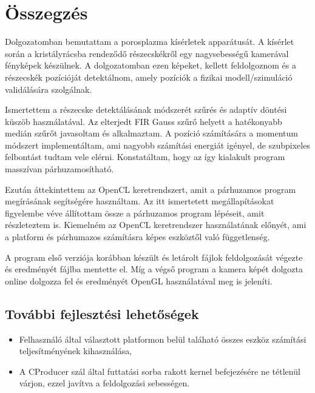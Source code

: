 \chapter{Összegzés}
	Dolgozatomban bemutattam a porosplazma kísérletek apparátusát. A kísérlet során a kristályrácsba
	rendeződő részecskékről egy nagysebességű kamerával fényképek készülnek. A dolgozatomban ezen
	képeket, kellett feldolgoznom és a részecskék pozícióját detektálnom, amely pozíciók a fizikai modell/szimuláció validálására
	szolgálnak.
	
	Ismertettem a részecske detektálásának módszerét szűrés és adaptív döntési küszöb használatával.
	Az elterjedt FIR Gauss szűrő helyett a hatékonyabb medián szűrőt javasoltam és alkalmaztam. A
	pozíció számítására a momentum módszert implementáltam, ami nagyobb számítási energiát igényel, de
	szubpixeles felbontást tudtam vele elérni. Konstatáltam, hogy az így kialakult program masszívan párhuzamosítható.
	
	Ezután áttekintettem az OpenCL keretrendszert, amit a párhuzamos program megírásának segítségére
	használtam. Az itt ismertetett megállapításokat figyelembe véve állítottam össze a párhuzamos
	program lépéseit, amit részleteztem is. Kiemelném az OpenCL keretrendszer használatának előnyét, ami a platform és párhumazos
	számításra képes eszköztől való függetlenség.
	
	A program első verziója korábban készült és letárolt fájlok feldolgozását végezte és eredményét fájlba mentette el. Míg a végső
	program a kamera képét dolgozta online dolgozza fel és eredményét OpenGL használatával meg is jeleníti.
	
	\section*{További fejlesztési lehetőségek}
	\begin{itemize}
		\item Felhasználó által választott platformon belül taláható összes eszköz számítási teljesítményének kihasználása,
		\item A CProducer szál által futtatási sorba rakott kernel befejezésére ne tétlenül várjon, ezzel javítva a feldolgozási
		sebességen.
	\end{itemize}